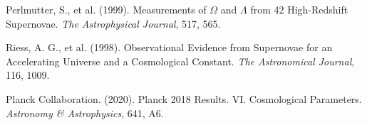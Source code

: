 \documentclass[a4paper,12pt]{article}
\begin{document}
\begin{thebibliography}{99}
		 Perlmutter, S., et al. (1999). Measurements of $\Omega$ and $\Lambda$ from 42 High-Redshift Supernovae. \textit{The Astrophysical Journal}, 517, 565.
		
		 Riess, A. G., et al. (1998). Observational Evidence from Supernovae for an Accelerating Universe and a Cosmological Constant. \textit{The Astronomical Journal}, 116, 1009.
		
		 Planck Collaboration. (2020). Planck 2018 Results. VI. Cosmological Parameters. \textit{Astronomy \& Astrophysics}, 641, A6.
		
	\end{thebibliography}
	
\end{document}
